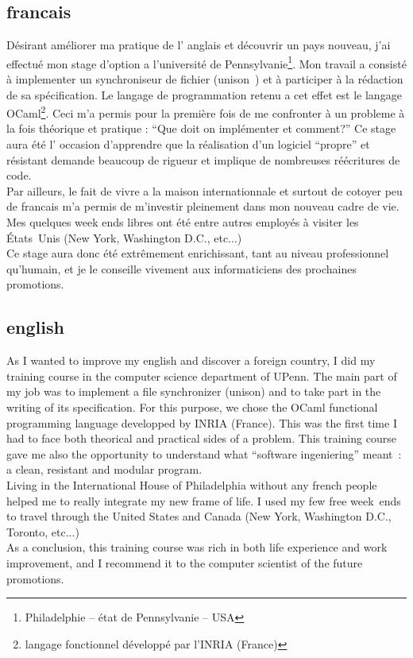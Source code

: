 \documentclass[11pt]{report}
\newcommand{\unison}{unison}
\begin{document}
\subsection*{francais}
D\'esirant am\'eliorer ma pratique de l' anglais et d\'ecouvrir un pays nouveau,
j'ai effectu\'e mon stage d'option a l'universit\'e de 
Pennsylvanie\footnote
{Philadelphie -- \'etat de Pennsylvanie -- USA}. Mon travail a consist\'e 
\`a implementer un synchroniseur de fichier (\unison\ ) et \`a participer 
\`a la r\'edaction de sa
sp\'ecification. Le langage de programmation retenu a cet effet est le langage 
OCaml\footnote{langage fonctionnel d\'evelopp\'e par l'INRIA (France)}. Ceci m'a permis pour la
premi\`ere fois de me confronter \`a un probleme \`a la fois th\'eorique et pratique
:
``Que doit on impl\'ementer et comment?'' Ce stage aura \'et\'e l'
occasion d'apprendre que
la r\'ealisation d'un logiciel ``propre'' et r\'esistant demande beaucoup de
rigueur et implique de nombreuses r\'e\'ecritures de code.\\
Par ailleurs, le fait de vivre a la maison internationnale et surtout de
cotoyer peu de francais m'a permis de m'investir pleinement dans mon nouveau
 cadre de vie. Mes quelques week ends libres ont \'et\'e entre autres 
employ\'es \`a visiter les \'Etats~Unis (New York, Washington D.C., etc...)\\
Ce stage aura donc \'et\'e extr\^emement enrichissant, tant au niveau 
professionnel qu'humain, et je le conseille vivement aux
informaticiens des prochaines promotions.

\subsection*{english} 
As I wanted to improve my english and discover a foreign country, I did my training course in the computer science department of UPenn. 
The main part of my job was to implement a file synchronizer (\unison ) and to
take part in the writing of its specification. 
For this purpose, we chose the OCaml functional programming language
developped by INRIA (France). 
This was the first time I had to face both theorical and practical sides of a problem. This training course gave me also the opportunity to understand what ``software ingeniering'' meant~: a clean, resistant and modular program.\\
Living in the International House of Philadelphia without any french people 
helped me to really integrate my new frame of life.
I used my few free week~ends to travel through the United States and Canada (New York, Washington D.C., Toronto, etc...)\\
As a conclusion, this training course was rich in both life experience and work improvement, and I recommend it to the computer scientist of the future promotions.
\newpage
\end{document}
